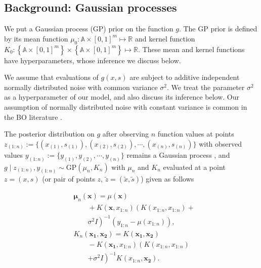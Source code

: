 \documentclass[letterpaper]{article}
\numberwithin{equation}{section}
\begin{document}
\subsection{Background: Gaussian processes}
\label{sect:gp}


We put a Gaussian process (GP) prior \citep{rasmussen2006gaussian} on the function $g$.  
The GP prior is defined by its mean function $\mu_{0}: \mathbb{A} \times [0, 1]^m \mapsto \mathbb{R}$ and kernel function $K_{0}: \left\{\mathbb{A} \times [0, 1]^m\right\} \times \left\{\mathbb{A} \times [0, 1]^m \right\} \mapsto \mathbb{R}$.  These mean and kernel functions have hyperparameters, whose inference we discuss below.

We assume that evaluations of $g(x,s)$ are subject to additive independent normally distributed noise with common variance $\sigma^2$.
We treat the parameter $\sigma^2$ as a hyperparameter of our model, and also discuss its inference below.  Our assumption of normally distributed noise with constant variance is common in the BO literature \citep{klein2016fast}. 

The posterior distribution on $g$ after observing $n$ function values at points $z_{(1:n)} := \{(x_{(1)}, s_{(1)}), (x_{(2)}, s_{(2)}), \cdots, (x_{(n)}, s_{(n)})\}$ with observed values $y_{(1:n)} := \{y_{(1)}, y_{(2)}, \cdots, y_{(n)}\}$ remains a Gaussian process \citep{rasmussen2006gaussian}, and $g \mid z_{(1:n)}, y_{(1:n)} \sim \text{GP}(\mu_n, K_n)$ with $\mu_n$ and $K_n$ evaluated at a point $z=(x,s)$ (or pair of points $z$, $\tilde{z} = (\tilde{x},\tilde{s})$) given as follows

\begin{equation}
\begin{split}
& \bm\mu_n(\bm{x}) = \mu(\bm{x})\\
&\qquad + K(\bm{x},x_{1:n}) \left(K(x_{1:n},x_{1:n})+\right.\\
&\qquad \left.\sigma^2 I \right)^{-1}  (y_{1:n}-\mu(x_{1:n})),\\
& K_{n}(\bm{x_1}, \bm{x_2}) =  K(\bm{x_1},\bm{x_2})\\
&\qquad - K(\bm{x_1},x_{1:n})  \left(K(x_{1:n},x_{1:n})\right.\\
&\qquad\left.+\sigma^2 I\right)^{-1} K(x_{1:n},\bm{x_2}).
\end{split}
\label{eq:posterior}
\end{equation}
\end{document}
